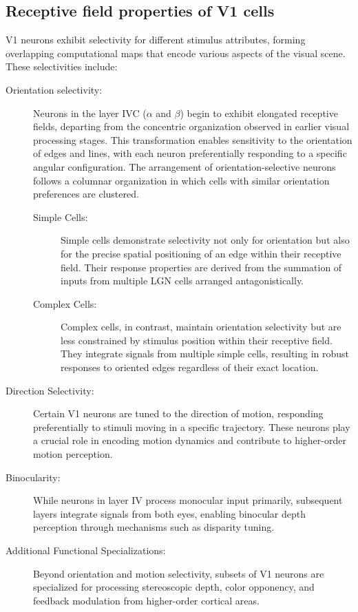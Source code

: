 \subsection{Receptive field properties of V1 cells}
\label{subsec:receptive_field}
V1 neurons exhibit selectivity for different stimulus attributes, forming
overlapping computational maps that encode various aspects of the visual scene. 
These selectivities include:

\begin{description}
    \item[Orientation selectivity:] Neurons in the layer IVC ($\alpha$ and $\beta$) begin to exhibit elongated receptive fields, departing from the concentric organization observed in earlier visual processing stages. This transformation enables sensitivity to the orientation of edges and lines, with each neuron preferentially responding to a specific angular configuration. The arrangement of orientation-selective neurons follows a columnar organization in which cells with similar orientation preferences are clustered.
    \begin{description}
        \item[Simple Cells:] Simple cells demonstrate selectivity not only for orientation 
        but also for the precise spatial positioning of an edge within their receptive field. 
        Their response properties are derived from the summation of inputs from multiple LGN cells arranged antagonistically.
        \item[Complex Cells:] Complex cells, in contrast, maintain orientation selectivity but are less constrained by stimulus position within their receptive field. They 
        integrate signals from multiple simple cells, resulting in robust responses to oriented edges regardless of their exact location.
    \end{description}
    \item[Direction Selectivity:] Certain V1 neurons are tuned to the direction of motion, 
    responding preferentially to stimuli moving in a specific trajectory. These neurons play a crucial role in encoding motion dynamics and contribute to higher-order motion perception.
    \item[Binocularity:] While neurons in layer IV process monocular input primarily, subsequent layers integrate signals from both eyes, enabling binocular depth perception through mechanisms such as disparity tuning.
    \item[Additional Functional Specializations:] Beyond orientation and motion selectivity, 
    subsets of V1 neurons are specialized for processing stereoscopic depth, color opponency, 
    and feedback modulation from higher-order cortical areas.
\end{description}

